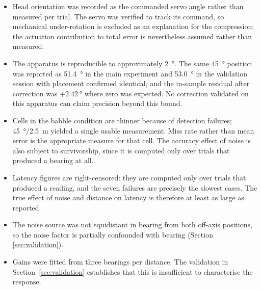 \begin{itemize}
  \item Head orientation was recorded as the commanded servo angle rather than
  measured per trial. The servo was verified to track its command, so
  mechanical under-rotation is excluded as an explanation for the compression;
  the actuation contribution to total error is nevertheless assumed rather
  than measured.

  \item The apparatus is reproducible to approximately \SI{2}{\degree}. The
  same \SI{45}{\degree} position was reported as \SI{51.4}{\degree} in the main
  experiment and \SI{53.0}{\degree} in the validation session with placement
  confirmed identical, and the in-sample residual after correction was
  $+\SI{2.42}{\degree}$ where zero was expected. No correction validated on
  this apparatus can claim precision beyond this bound.

  \item Cells in the babble condition are thinner because of detection
  failures; \SI{45}{\degree}/\SI{2.5}{\metre} yielded a single usable
  measurement. Miss rate rather than mean error is the appropriate measure for
  that cell. The accuracy effect of noise is also subject to survivorship,
  since it is computed only over trials that produced a bearing at all.

  \item Latency figures are right-censored: they are computed only over trials
  that produced a reading, and the seven failures are precisely the slowest
  cases. The true effect of noise and distance on latency is therefore at
  least as large as reported.

  \item The noise source was not equidistant in bearing from both off-axis
  positions, so the noise factor is partially confounded with bearing (Section
  \ref{sec:validation}).

  \item Gains were fitted from three bearings per distance. The validation in
  Section~\ref{sec:validation} establishes that this is insufficient to
  characterise the response.
\end{itemize}
